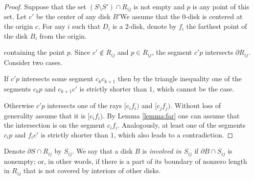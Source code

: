 
\begin{proof}
Suppose that the set $(S\setminus S')\cap R_{ij}$ is not empty and $p$ is any point of this set. Let $c'$ be the center of any disk $B'$We assume that the $0$-disk is centered at the origin $c$. For any $i$ such that $D_i$ is a $2$-disk, denote by $f_i$ the farthest point of the disk $B_i$ from the origin.

 containing the point $p$. Since $c'\not\in R_{ij}$ and $p\in R_{ij}$, the segment $c'p$ intersects $\partial{R_{ij}}$. Consider two cases.

If $c'p$ intersects some segment $c_kc_{k+1}$ then by the triangle inequality one of the segments $c_kp$ and $c_{k+1}c'$ is strictly shorter than $1$, which cannot be the case.

Otherwise $c'p$ intersects one of the rays $[c_if_i)$ and $[c_jf_j)$. Without loss of generality assume that it is $[c_if_i)$. By Lemma \ref{lemma:far} one can assume that the intersection is on the segment $c_if_i$. Analogously, at least one of the segments $c_ip$ and $f_ic'$ is strictly shorter than $1$, which also leads to a contradiction.
\end{proof}


Denote $\partial S\cap R_{ij}$ by $S_{ij}$.
We say that a disk $B$ is \textit{involved in $S_{ij}$} if $\partial{B}\cap S_{ij}$ is nonempty; or, in other words, if there is a part of its boundary of nonzero length in $R_{ij}$ that is not covered by interiors of other disks. %


